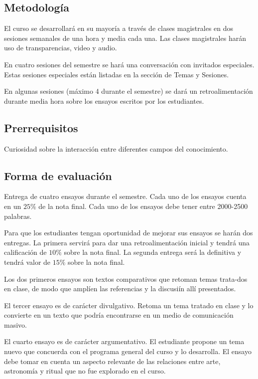 \documentclass{report}
\begin{document}
\subsection*{Metodolog\'ia}

El curso se desarrollar\'a en su mayor\'ia a trav\'es de clases
magistrales en dos sesiones semanales de una hora y media cada
una. Las clases magistrales har\'an uso de transparencias, video y
audio. 

En cuatro sesiones del semestre se har\'a una conversaci\'on con
invitados especiales. Estas sesiones especiales est\'an listadas en la
secci\'on de Temas y Sesiones.  

En algunas sesiones (m\'aximo 4 durante el semestre) se dar\'a un
retroalimentaci\'on durante media hora sobre los ensayos escritos por los
estudiantes. 

\subsection*{Prerrequisitos}
Curiosidad sobre la interacci\'on entre diferentes campos del
conocimiento.


\subsection*{Forma de evaluaci\'on}

Entrega de cuatro ensayos durante el semestre. Cada uno de los ensayos
cuenta en un $25 \%$ de la nota final. Cada uno de los ensayos debe
tener entre 2000-2500 palabras.  

Para que los estudiantes tengan oportunidad de mejorar sus ensayos se
har\'an dos entregas. La primera servir\'a para dar una
retroalimentaci\'on inicial y tendr\'a una calificaci\'on de $10\%$
sobre la nota final. La segunda entrega ser\'a la definitiva y
tendr\'a  valor de $15\%$ sobre la nota final. 
 
Los dos primeros ensayos son textos comparativos que retoman temas
trata-dos en clase, de modo que ampl\'ien las referencias y la
discusi\'in all\'i presentados.

El tercer ensayo es de car\'acter divulgativo. Retoma un tema
tratado en clase y lo convierte en un texto que podr\'ia encontrarse
en un medio de comunicaci\'on masivo.  

El cuarto ensayo es de car\'acter argumentativo. El estudiante propone
un tema nuevo que concuerda con el programa general del curso y lo
desarrolla. El ensayo debe tomar en cuenta un aspecto
relevante de las relaciones entre arte, astronom\'ia y ritual que
no fue explorado en el curso. 
\end{document}
